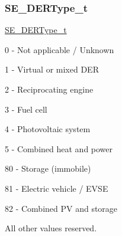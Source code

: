 \subsubsection{\texorpdfstring{S\+E\+\_\+\+D\+E\+R\+Type\+\_\+t}{SE\_DERType\_t}}
{\footnotesize\ttfamily \hyperlink{group__DERType_gad0e420a05951a4331fb39782b428852f}{S\+E\+\_\+\+D\+E\+R\+Type\+\_\+t}}

0 -\/ Not applicable / Unknown

1 -\/ Virtual or mixed D\+ER

2 -\/ Reciprocating engine

3 -\/ Fuel cell

4 -\/ Photovoltaic system

5 -\/ Combined heat and power

80 -\/ Storage (immobile)

81 -\/ Electric vehicle / E\+V\+SE

82 -\/ Combined PV and storage

All other values reserved. 